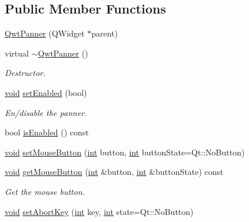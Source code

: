 \subsection*{Public Member Functions}
\begin{DoxyCompactItemize}
\item 
\hyperlink{class_qwt_panner_af5482be26d69a64c3880653265240736}{Qwt\-Panner} (Q\-Widget $\ast$parent)
\item 
virtual \hyperlink{class_qwt_panner_a19c9b9a08da05649f6d2ef5bf6fb391c}{$\sim$\-Qwt\-Panner} ()
\begin{DoxyCompactList}\small\item\em Destructor. \end{DoxyCompactList}\item 
\hyperlink{group___u_a_v_objects_plugin_ga444cf2ff3f0ecbe028adce838d373f5c}{void} \hyperlink{class_qwt_panner_a43e06c262c945fc7faeb729539bbde58}{set\-Enabled} (bool)
\begin{DoxyCompactList}\small\item\em En/disable the panner. \end{DoxyCompactList}\item 
bool \hyperlink{class_qwt_panner_a7b0bae829d1ee12208ab8722d52d15a1}{is\-Enabled} () const 
\item 
\hyperlink{group___u_a_v_objects_plugin_ga444cf2ff3f0ecbe028adce838d373f5c}{void} \hyperlink{class_qwt_panner_aa2b37fa4cb48abf82ae0308b3e5992c5}{set\-Mouse\-Button} (\hyperlink{ioapi_8h_a787fa3cf048117ba7123753c1e74fcd6}{int} button, \hyperlink{ioapi_8h_a787fa3cf048117ba7123753c1e74fcd6}{int} button\-State=Qt\-::\-No\-Button)
\item 
\hyperlink{group___u_a_v_objects_plugin_ga444cf2ff3f0ecbe028adce838d373f5c}{void} \hyperlink{class_qwt_panner_aa73f227e3337b0ff66da78ca42968d85}{get\-Mouse\-Button} (\hyperlink{ioapi_8h_a787fa3cf048117ba7123753c1e74fcd6}{int} \&button, \hyperlink{ioapi_8h_a787fa3cf048117ba7123753c1e74fcd6}{int} \&button\-State) const 
\begin{DoxyCompactList}\small\item\em Get the mouse button. \end{DoxyCompactList}\item 
\hyperlink{group___u_a_v_objects_plugin_ga444cf2ff3f0ecbe028adce838d373f5c}{void} \hyperlink{class_qwt_panner_a4545ea538c2a6946b1027f95cfb51c9f}{set\-Abort\-Key} (\hyperlink{ioapi_8h_a787fa3cf048117ba7123753c1e74fcd6}{int} key, \hyperlink{ioapi_8h_a787fa3cf048117ba7123753c1e74fcd6}{int} state=Qt\-::\-No\-Button)

\end{DoxyCompactItemize}
